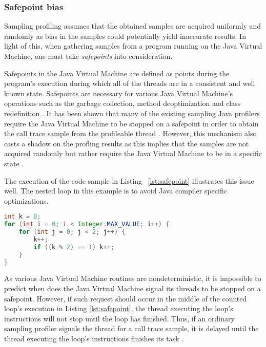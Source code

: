 \documentclass[..thesis.tex]{subfiles}
\begin{document}
\subsubsection{Safepoint bias}
Sampling profiling assumes that the obtained samples are acquired uniformly and randomly as bias in the samples could potentially yield inaccurate results. In light of this, when gathering samples from a program running on the Java Virtual Machine, one must take \textit{safepoints} into consideration.

Safepoints in the Java Virtual Machine are defined as points during the program's execution during which all of the threads are in a consistent and well known state. Safepoints are necessary for various Java Virtual Machine's operations such as the garbage collection, method deoptimization and class redefinition \cite{hotspot_glossary}. It has been shown that many of the existing sampling Java profilers require the Java Virtual Machine to be stopped on a safepoint in order to obtain the call trace sample from the profileable thread \cite{wakart_psychosomatic_2016}. However, this mechanism also casts a shadow on the profling results as this implies that the samples are not acquired randomly but rather require the Java Virtual Machine to be in a specific state \cite{mytkowicz_evaluating_2010}. 

The execution of the code sample in Listing ~\ref{lst:safepoint} illustrates this issue well. The nested loop in this example is to avoid Java compiler specific optimizations.
\begin{lstlisting}[language=java,style=def,label={lst:safepoint}, caption={Counted loops do not contain safepoints}]
int k = 0;
for (int i = 0; i < Integer.MAX_VALUE; i++) {
	for (int j = 0; j < 2; j++) {
    	k++;
    	if ((k % 2) == 1) k++;
	}
}
\end{lstlisting}
As various Java Virtual Machine routines are nondeterministic, it is impossible to predict when does the Java Virtual Machine signal its threads to be stopped on a safepoint. However, if such request should occur in the middle of the counted loop's execution in Listing \ref{lst:safepoint}, the thread executing the loop's instructions will not stop until the loop has finished. Thus, if an ordinary sampling profiler signals the thread for a call trace sample, it is delayed until the thread executing the loop's instructions finishes its task \cite{wakart_psychosomatic_2015}. 
\end{document}
